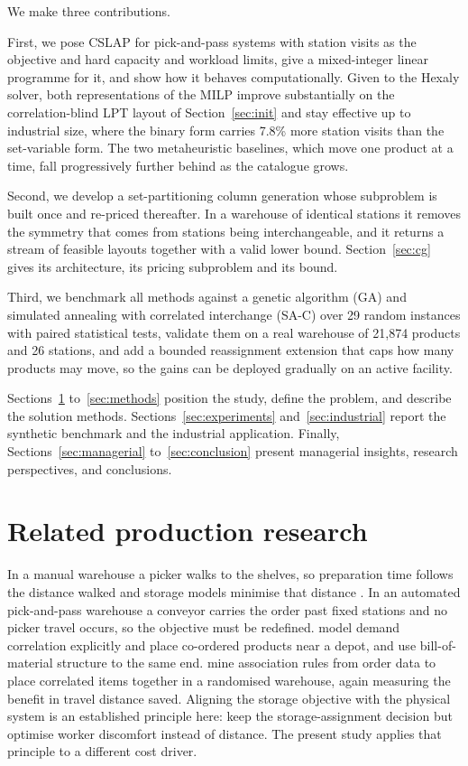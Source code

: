 \documentclass[]{interact}
\begin{document}
We make three contributions.

First, we pose CSLAP for pick-and-pass systems with station visits as the objective and hard capacity and workload limits, give a mixed-integer linear programme for it, and show how it behaves computationally. Given to the Hexaly solver, both representations of the MILP improve substantially on the correlation-blind LPT layout of Section~\ref{sec:init} and stay effective up to industrial size, where the binary form carries 7.8\% more station visits than the set-variable form. The two metaheuristic baselines, which move one product at a time, fall progressively further behind as the catalogue grows.

Second, we develop a set-partitioning column generation whose subproblem is built once and re-priced thereafter. In a warehouse of identical stations it removes the symmetry that comes from stations being interchangeable, and it returns a stream of feasible layouts together with a valid lower bound. Section~\ref{sec:cg} gives its architecture, its pricing subproblem and its bound.

Third, we benchmark all methods against a genetic algorithm (GA) and simulated annealing with correlated interchange (SA-C) over 29 random instances with paired statistical tests, validate them on a real warehouse of 21,874 products and 26 stations, and add a bounded reassignment extension that caps how many products may move, so the gains can be deployed gradually on an active facility.

Sections~\ref{sec:litreview} to~\ref{sec:methods} position the study, define the problem, and describe the solution methods. Sections~\ref{sec:experiments} and~\ref{sec:industrial} report the synthetic benchmark and the industrial application. Finally, Sections~\ref{sec:managerial} to~\ref{sec:conclusion} present managerial insights, research perspectives, and conclusions.

\section{Related production research}\label{sec:litreview}
In a manual warehouse a picker walks to the shelves, so preparation time follows the distance walked and storage models minimise that distance \citep{islam2023, wang2020}. In an automated pick-and-pass warehouse a conveyor carries the order past fixed stations and no picker travel occurs, so the objective must be redefined. \citet{zhang2019cie} model demand correlation explicitly and place co-ordered products near a depot, and \citet{xiao2010correlated} use bill-of-material structure to the same end. \citet{pang2017datamining} mine association rules from order data to place correlated items together in a randomised warehouse, again measuring the benefit in travel distance saved. Aligning the storage objective with the physical system is an established principle here: \citet{larco2017discomfort} keep the storage-assignment decision but optimise worker discomfort instead of distance. The present study applies that principle to a different cost driver.
\end{document}
